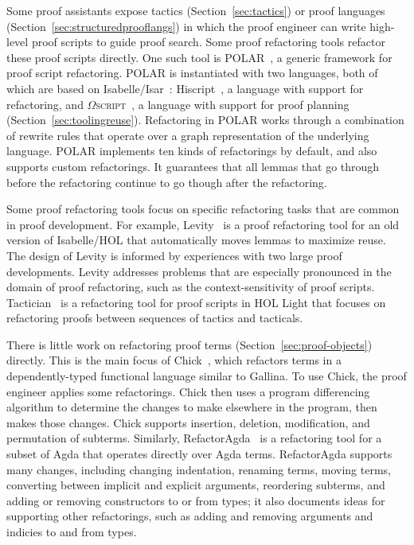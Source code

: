 Some proof assistants expose tactics (Section~\ref{sec:tactics}) or proof languages (Section~\ref{sec:structuredprooflangs})
in which the proof engineer can write high-level proof scripts to guide proof search.
Some proof refactoring tools refactor these proof scripts directly.
One such tool is \textsc{POLAR}~\citep{Dietrich2013}, a generic framework for proof script refactoring. 
\textsc{POLAR} is instantiated with two languages,
both of which are based on Isabelle/Isar~\citep{Wenzel2007isar}:
Hiscript~\citep{WhitesidePhD}, a language with support for refactoring,
and $\Omega$\textsc{script}~\citep{dietrich2011}, a language with support for proof planning (Section~\ref{sec:toolingreuse}).
Refactoring in \textsc{POLAR} works through a combination of rewrite rules that operate over
a graph representation of the underlying language. %
\textsc{POLAR} implements ten kinds of refactorings by default,
and also supports custom refactorings.
It guarantees that all lemmas that go through before
the refactoring continue to go though after the refactoring.

Some proof refactoring tools focus on specific refactoring tasks that are common in proof development.
For example, Levity~\citep{Bourke12} is a proof refactoring tool for an old version of Isabelle/HOL that automatically
moves lemmas to maximize reuse. The design of Levity is informed by experiences with two large proof developments.
Levity addresses problems that are especially pronounced in the domain of proof refactoring, such as the
context-sensitivity of proof scripts. Tactician~\citep{adams2015} is a refactoring tool for proof scripts in HOL Light
that focuses on refactoring proofs between sequences of tactics and tacticals.
 
There is little work on refactoring proof terms (Section~\ref{sec:proof-objects}) directly. This is the main focus of Chick~\citep{robert2018}, 
which refactors terms in a dependently-typed functional language similar to Gallina. To use Chick, the proof engineer applies some refactorings.
Chick then uses a program differencing algorithm to determine the changes to make elsewhere in the program,
then makes those changes. Chick supports insertion, deletion, modification, and permutation of subterms.
Similarly, RefactorAgda~\citep{wibergh2019} is a refactoring tool for a subset of Agda that operates directly
over Agda terms. RefactorAgda supports many changes, including changing indentation, renaming terms, moving terms, converting between implicit and
explicit arguments, reordering subterms, and adding or removing constructors to or from types; 
it also documents ideas for supporting other refactorings, such as adding and removing arguments and indicies to and from types. 

